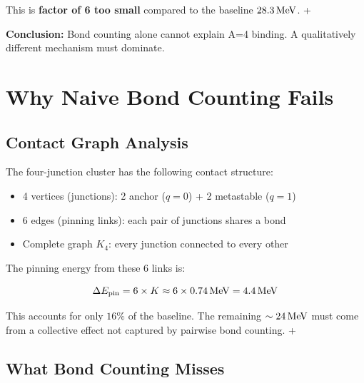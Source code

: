 This is \textbf{factor of 6 too small} compared to the baseline
$28.3\,\mathrm{MeV}$. \tagDc + \tagBL

\begin{resultbox}
    \textbf{Conclusion:} Bond counting alone cannot explain A=4 binding.
    A qualitatively different mechanism must dominate.
\end{resultbox}

\section{Why Naive Bond Counting Fails}
\label{sec:he4:fail}

\subsection{Contact Graph Analysis}

The four-junction cluster has the following contact structure:

\begin{itemize}
    \item 4 vertices (junctions): 2 anchor ($q = 0$) + 2 metastable ($q = 1$)
    \item 6 edges (pinning links): each pair of junctions shares a bond
    \item Complete graph $K_4$: every junction connected to every other
\end{itemize}

The pinning energy from these 6 links is:

\begin{derivationbox}
    \begin{equation}
        \Delta E_{\text{pin}} = 6 \times K \approx 6 \times 0.74\,\mathrm{MeV}
        = 4.4\,\mathrm{MeV}
        \label{eq:pin_contribution}
    \end{equation}
    \tagDc
\end{derivationbox}

This accounts for only $16\%$ of the baseline. The remaining $\sim 24\,\mathrm{MeV}$
must come from a collective effect not captured by pairwise bond counting.
\tagDc + \tagBL

\subsection{What Bond Counting Misses}

